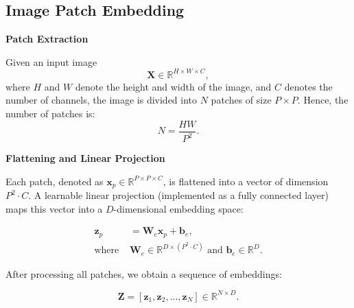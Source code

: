 \subsection{Image Patch Embedding}

\textbf{Patch Extraction}

Given an input image 
\begin{equation}
    \mathbf{X} \in \mathbb{R}^{H \times W \times C},
\end{equation}
where \(H\) and \(W\) denote the height and width of the image, and \(C\) denotes the number of channels, the image is divided into \(N\) patches of size \(P \times P\). Hence, the number of patches is:
\begin{equation}
N = \frac{HW}{P^2}.
\end{equation}

\textbf{Flattening and Linear Projection}

Each patch, denoted as \(\mathbf{x}_p \in \mathbb{R}^{P \times P \times C}\), is flattened into a vector of dimension \(P^2 \cdot C\). A learnable linear projection (implemented as a fully connected layer) maps this vector into a \(D\)-dimensional embedding space:

\vspace{-\baselineskip} %
\begin{align}
    \mathbf{z}_p &= \mathbf{W}_e \mathbf{x}_p + \mathbf{b}_e, \nonumber \\
    \text{where } & \mathbf{W}_e \in \mathbb{R}^{D \times (P^2 \cdot C)} \text{ and } \mathbf{b}_e \in \mathbb{R}^{D}.
\end{align}
\vspace{-\baselineskip} %

After processing all patches, we obtain a sequence of embeddings:

\begin{equation}
\mathbf{Z} = \left[\mathbf{z}_1, \mathbf{z}_2, \dots, \mathbf{z}_N\right] \in \mathbb{R}^{N \times D}.
\end{equation}


